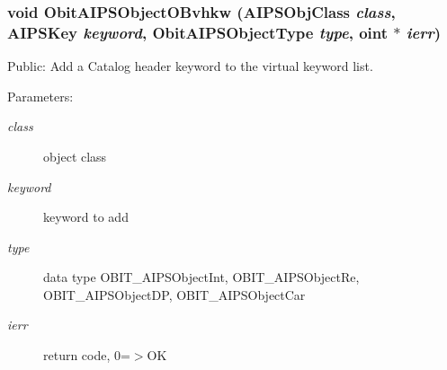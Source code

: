 \subsubsection{\setlength{\rightskip}{0pt plus 5cm}void Obit\-AIPSObject\-OBvhkw ({\bf AIPSObj\-Class} {\em class}, {\bf AIPSKey} {\em keyword}, Obit\-AIPSObject\-Type {\em type}, {\bf oint} $\ast$ {\em ierr})}\label{ObitAIPSObject_8h_a11}


Public: Add a Catalog header keyword to the virtual keyword list. 

\begin{Desc}
\item[Parameters:]
\begin{description}
\item[{\em class}]object class \item[{\em keyword}]keyword to add \item[{\em type}]data type OBIT\_\-AIPSObject\-Int, OBIT\_\-AIPSObject\-Re, OBIT\_\-AIPSObject\-DP, OBIT\_\-AIPSObject\-Car \item[{\em ierr}]return code, 0=$>$OK \end{description}
\end{Desc}
